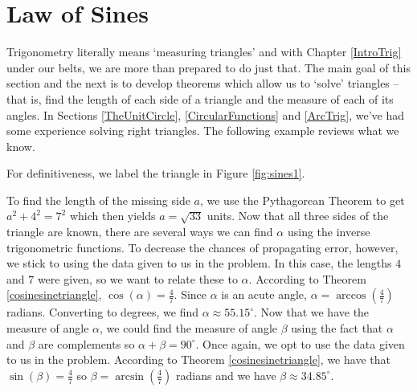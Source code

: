 \section{Law of Sines}

\label{LawofSines}

Trigonometry literally means `measuring triangles' and with Chapter \ref{IntroTrig} under our belts, we are more than prepared to do just that.  The main goal of this section and the next is to develop theorems which allow us to `solve' triangles -- that is, find the length of each side of a triangle and the measure of each of its angles. In Sections \ref{TheUnitCircle}, \ref{CircularFunctions} and \ref{ArcTrig}, we've had some experience solving right triangles.  The following example reviews what we know.

\medskip

{For definitiveness, we label the triangle in Figure \ref{fig:sines1}.


To find the length of the missing side $a$, we use the Pythagorean Theorem to get $a^2 + 4^2 = 7^2$ which then yields $a = \sqrt{33}$ units. Now that all three sides of the triangle are known, there are several ways we can find $\alpha$ using the inverse trigonometric functions.  To decrease the chances of propagating error, however, we stick to using the data given to us in the problem.  In this case, the lengths $4$ and $7$ were given, so we want to relate these to $\alpha$. According to  Theorem \ref{cosinesinetriangle},  $\cos(\alpha) = \frac{4}{7}$.  Since $\alpha$ is an acute angle, $\alpha = \arccos\left(\frac{4}{7}\right)$ radians.  Converting to degrees, we find $\alpha \approx 55.15^{\circ}$.  Now that we have the measure of angle $\alpha$, we could find the measure of angle $\beta$ using the fact that $\alpha$ and $\beta$ are complements so $\alpha + \beta = 90^{\circ}$. Once again, we opt to use the data given to us in the problem. According to Theorem \ref{cosinesinetriangle}, we have that $\sin(\beta) = \frac{4}{7}$ so $\beta = \arcsin\left(\frac{4}{7}\right)$ radians and we have $\beta \approx 34.85^{\circ}$. }

